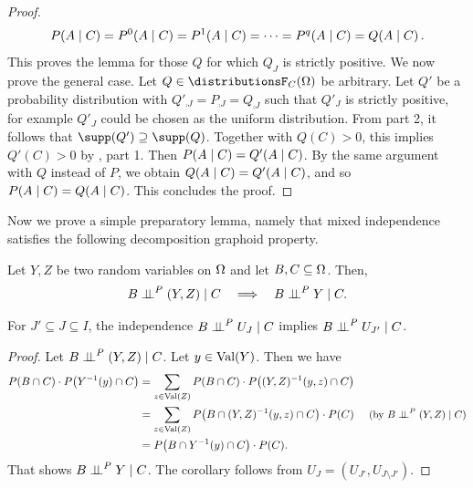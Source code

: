 \documentclass[USenglish,onecolumn]{article}
\begin{document}
\begin{proof}
  \begin{equation*}
    P(A \mid C) = P^0(A \mid C) = P^1(A \mid C) = \dots = P^q(A \mid C) = Q(A \mid C)\,.
  \end{equation*}
  This proves the lemma for those $Q$ for which $Q_J$ is strictly positive. We now prove the general case. Let $Q\in \distributionsF_C(\Omg)$ be arbitrary.
  Let $Q'$ be a probability distribution with $Q'_{\comp{J}} = P_{\comp{J}} = Q_{\comp{J}}$ such that $Q'_{J}$ is strictly positive, for example $Q'_{J}$ could be chosen as the uniform distribution.  From  part 2,
  it follows that $\supp(Q') \supseteq \supp(Q)$. Together with
  $Q(C) > 0$, this implies $Q'(C) > 0$ by , part 1.
  Then $P(A \mid C) = Q'(A \mid C)$. By the same argument with $Q$ instead of $P$, we obtain %
  $Q(A \mid C) = Q'(A \mid C)$, and so $P(A \mid C) = Q(A \mid C)$.
  This concludes the proof.
\end{proof}

Now we prove a simple preparatory lemma, namely that mixed independence satisfies the following decomposition graphoid property.

\begin{lemma}
  \label{lemma:decomposition_graphoid_rule}
  Let $Y, Z$ be two random variables on $\Omega$ and let $B, C \subseteq \Omega$.
  Then,
  \begin{equation*}
    B \mathrel{\perp\!\!\!\perp}^P (Y, Z) \mid C \quad \Longrightarrow \quad B \mathrel{\perp\!\!\!\perp}^P Y \mid C.
  \end{equation*}
  \end{lemma}
  \begin{corollary}
  \label{cor:decomposition}
For $J' \subseteq J \subseteq I$, the independence $B \mathrel{\perp\!\!\!\perp}^P U_{J} \mid C$ implies $B \mathrel{\perp\!\!\!\perp}^P U_{J'} \mid C$.
  \end{corollary}


\begin{proof}
  Let $B\mathrel{\perp\!\!\!\perp}^P(Y,Z)\mid C$.
  Let $y \in \textnormal{Val}(Y)$.
  Then we have
  \begin{align*}
    P(B \cap C) \cdot P\big(Y^{-1}(y) \cap C\big) &=
    \sum_{z \in \Val(Z)} P(B \cap C) \cdot P\big( (Y, Z)^{-1}(y, z) \cap C \big) \\
    &= \sum_{z \in \Val(Z)} P\big(B \cap (Y, Z)^{-1}(y, z) \cap C \big) \cdot P(C)&\text{\small(by $B\indep^P(Y,Z)\given C$)} \\
    &=  P\big( B \cap Y^{-1}(y) \cap C \big) \cdot P(C).
  \end{align*}
That shows $B \mathrel{\perp\!\!\!\perp}^P Y \mid C$.
The corollary follows from $U_J = (U_{J'}, U_{J \setminus J'})$.
\end{proof}
\end{document}
